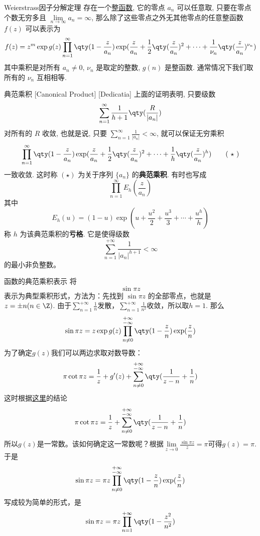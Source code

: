 \documentclass[UTF8]{ctexart}
\begin{document}
        \begin{thm}
            {Weierstrass因子分解定理}
            存在一个\hyperref[dfn:EntireFunction]{整函数}, 它的零点 \(a_n\) 可以任意取, 只要在零点个数无穷多且 \(\lim\limits_{n\to\infty }a_n=\infty\), 那么除了这些零点之外无其他零点的任意整函数 \(f(z)\) 可以表示为
            \[f(z)=z^m\exp g(z)\prod_{n=1}^{\infty}\qty(1-\frac{z}{a_n})\exp(\frac{z}{a_n}+\frac{1}{2}\qty(\frac{z}{a_n})^2+\cdots+\frac{1}{\nu_n}\qty(\frac{z}{a_n})^{\nu_n})\]
            其中乘积是对所有 \(a_n\neq 0\),  \(\nu_n\) 是取定的整数,  \(g(n)\) 是整函数. 通常情况下我们取所有的 \(\nu_n\) 互相相等. 
        \end{thm}

        \begin{dfn}
            [CanonicalProduct]
            {典范乘积}
            [Canonical Product]
            [Dedicatia]
            上面的证明表明, 只要级数
            \[\sum_{n=1}^{\infty}\frac{1}{h+1}\qty(\frac{R}{|a_n|})\]
            对所有的 \(R\) 收敛, 也就是说, 只要 \(\sum\limits_{n=1}^{\infty}\frac{1}{|a_n|}<\infty\), 就可以保证无穷乘积
            \[\prod_{n=1}^{\infty}\qty(1-\frac{z}{a_n})\exp(\frac{z}{a_n}+\frac{1}{2}\qty(\frac{z}{a_n})^2+\cdots+\frac{1}{h}\qty(\frac{z}{a_n})^{h})\tag{ \(\star\) }\]
            一致收敛. 这时称 \((\star)\) 为关于序列 \(\{a_n\}\) 的\textbf{典范乘积}. 有时也写成
            \[\prod_{n=1}^{\infty}E_h(\frac{z}{a_n})\]
            其中
            \[E_h(u)=(1-u)\exp(u+\frac{u^2}{2}+\frac{u^3}{3}+\cdots+\frac{u^h}{h})\]
            称 \(h\) 为该典范乘积的\textbf{亏格}. 它是使得级数
            \[\sum_{n=1}^{+\infty}\frac{1}{|a_n|^{h+1}}<\infty\]
            的最小非负整数。
        \end{dfn}

        \begin{xmp}
            {函数的典范乘积表示}
            将
            \[\sin \pi z\]
            表示为典型乘积形式，方法为：先找到 \(\sin\pi z\) 的全部零点，也就是 \(z=\pm n(n\in\Z)\). 由于$\sum_{n=1}^{+\infty}\frac{1}{n}$发散，$\sum_{n=1}^{+\infty}\frac{1}{n^2}$收敛，所以取$h=1$. 那么
            \[\sin\pi z=z\exp g(z)\prod_{n\neq 0}^{\substack{+\infty\\ -\infty}}\qty(1-\frac{z}{n})\exp(\frac{z}{n})\]
            为了确定$g(z)$我们可以两边求取对数导数：
            \[\pi\cot\pi z=\frac{1}{z}+g'(z)+\sum_{n\neq 0}^{\substack{+\infty\\ -\infty}}\qty(\frac{1}{z-n}+\frac{1}{n})\]
            这时根据\hyperref[xmp:64]{这里}的结论
            \[\pi\cot\pi z=\frac{1}{z}+\sum_{n\neq 0}^{\substack{+\infty\\ -\infty}}\qty(\frac{1}{z-n}+\frac{1}{n})\]
            所以$g(z)$是一常数。该如何确定这一常数呢？根据$\lim\limits_{z\to 0}\frac{\sin\pi z}{z}=\pi$可得$g(z)=\pi$. 于是
            \[\sin\pi z=\pi z\prod_{n\neq 0}^{\substack{+\infty\\ -\infty}}\qty(1-\frac{z}{n})\exp(\frac{z}{n})\]
            写成较为简单的形式，是
            \[\sin\pi z=\pi z\prod_{n=1}^{+\infty}\qty(1-\frac{z^2}{n^2})\]
        \end{xmp}
\end{document}
